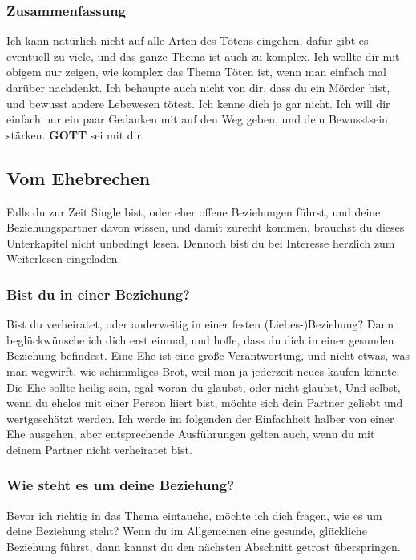 \documentclass[12pt,a5paper]{article}
\newcommand{\Gott}[0]{\textbf{GOTT}}
\begin{document}
	\subsubsection{Zusammenfassung}
		Ich kann nat\"urlich nicht auf alle Arten des T\"otens eingehen,
		daf\"ur gibt es eventuell zu viele,
		und das ganze Thema ist auch zu komplex.
		Ich wollte dir mit obigem nur zeigen,
		wie komplex das Thema T\"oten ist,
		wenn man einfach mal dar\"uber nachdenkt.
		Ich behaupte auch nicht von dir,
		dass du ein M\"order bist,
		und bewusst andere Lebewesen t\"otest.
		Ich kenne dich ja gar nicht.
		Ich will dir einfach nur ein paar Gedanken mit auf den Weg geben,
		und dein Bewusstsein st\"arken.
		{\Gott} sei mit dir.
	
	\subsection{Vom Ehebrechen}
		Falls du zur Zeit Single bist,
		oder eher offene Beziehungen f\"uhrst,
		und deine Beziehungspartner davon wissen,
		und damit zurecht kommen,
		brauchst du dieses Unterkapitel nicht unbedingt lesen.
		Dennoch bist du bei Interesse herzlich zum Weiterlesen eingeladen.

	\subsubsection{Bist du in einer Beziehung?}
		Bist du verheiratet,
		oder anderweitig in einer festen (Liebes-)Beziehung?
		Dann begl\"uckw\"unsche ich dich erst einmal,
		und hoffe,
		dass du dich in einer gesunden Beziehung befindest.
		Eine Ehe ist eine gro{\ss}e Verantwortung,
		und nicht etwas,
		was man wegwirft,
		wie schimmliges Brot,
		weil man ja jederzeit neues kaufen k\"onnte.
		Die Ehe sollte heilig sein,
		egal woran du glaubst,
		oder nicht glaubst,
		Und selbst,
		wenn du ehelos mit einer Person liiert bist,
		m\"ochte sich dein Partner geliebt und wertgesch\"atzt werden.
		Ich werde im folgenden der Einfachheit halber von einer Ehe ausgehen,
		aber entsprechende Ausf\"uhrungen gelten auch,
		wenn du mit deinem Partner nicht verheiratet bist.

	\subsubsection{Wie steht es um deine Beziehung?}
		Bevor ich richtig in das Thema eintauche,
		m\"ochte ich dich fragen,
		wie es um deine Beziehung steht?
		Wenn du im Allgemeinen eine gesunde,
		gl\"uckliche Beziehung f\"uhrst,
		dann kannst du den n\"achsten Abschnitt getrost \"uberspringen.
\end{document}
